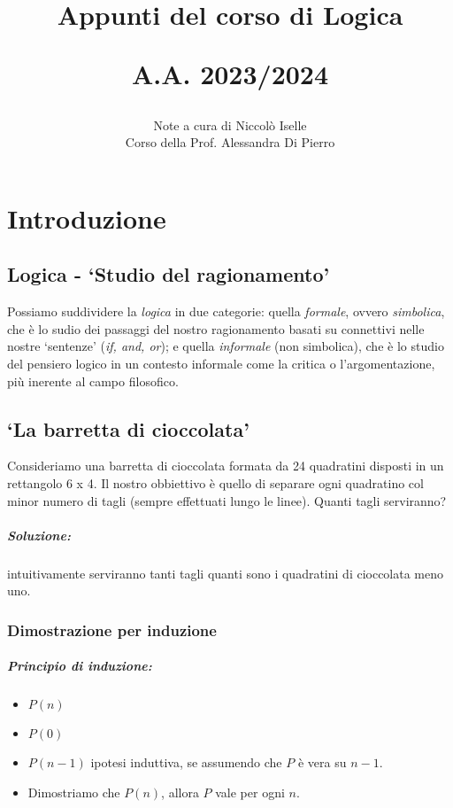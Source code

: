 \documentclass[a4paper,12pt]{report}
\begin{document}
\title{Appunti del corso di Logica 

A.A. 2023/2024}
\author{Note a cura di Niccol\`{o} Iselle\\
Corso della Prof. Alessandra Di Pierro}
\date{}
\maketitle
\tableofcontents

\chapter{Introduzione}
\section{Logica - `Studio del ragionamento'}
Possiamo suddividere la \emph{logica} in due categorie: quella \emph{formale}, ovvero \emph{simbolica}, che \`{e} lo sudio dei passaggi del nostro ragionamento basati su connettivi nelle nostre `sentenze' (\emph{if, and, or}); e quella \emph{informale} (non simbolica), che \`{e} lo studio del pensiero logico in un contesto informale come la critica o l'argomentazione, pi\`{u} inerente al campo filosofico. 

\section{`La barretta di cioccolata'}
Consideriamo una barretta di cioccolata formata da 24 quadratini disposti in un
rettangolo 6 x 4. Il nostro obbiettivo \`{e} quello di separare ogni quadratino
col minor numero di tagli (sempre effettuati lungo le linee). Quanti tagli serviranno?

\paragraph{Soluzione:} intuitivamente serviranno tanti tagli quanti sono i quadratini di cioccolata meno uno.

\subsection{Dimostrazione per induzione}
\paragraph{Principio di induzione:} 
\begin{itemize}
\item $ P(n) $
\item $ P(0) $
\item $ P(n-1) $ ipotesi induttiva, se assumendo che $P$ \`{e} vera su $n-1$.
\item Dimostriamo che $P(n)$, allora $P$ vale per ogni $n$.
\end{itemize}
\end{document}
